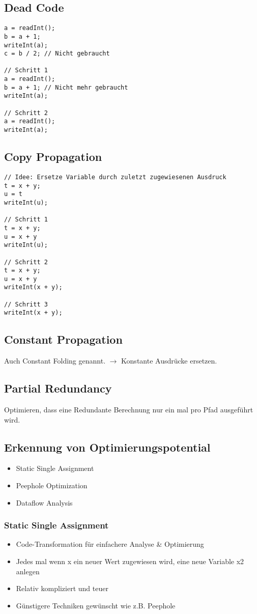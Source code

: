\subsection{Dead Code}
\begin{lstlisting}
a = readInt();
b = a + 1;
writeInt(a);
c = b / 2; // Nicht gebraucht

// Schritt 1
a = readInt();
b = a + 1; // Nicht mehr gebraucht
writeInt(a);

// Schritt 2
a = readInt();
writeInt(a);
\end{lstlisting}

\subsection{Copy Propagation}
\begin{lstlisting}
// Idee: Ersetze Variable durch zuletzt zugewiesenen Ausdruck
t = x + y;
u = t
writeInt(u);

// Schritt 1
t = x + y;
u = x + y
writeInt(u);

// Schritt 2
t = x + y;
u = x + y
writeInt(x + y);

// Schritt 3
writeInt(x + y);
\end{lstlisting}

\subsection{Constant Propagation}
Auch Constant Folding genannt. $\rightarrow$ Konstante Ausdrücke ersetzen.

\subsection{Partial Redundancy}
Optimieren, dass eine Redundante Berechnung nur ein mal pro Pfad ausgeführt wird.

\subsection{Erkennung von Optimierungspotential}
\begin{itemize}[topsep=0pt]
    \itemsep -0.2em
    \item Static Single Assignment
    \item Peephole Optimization
    \item Dataflow Analysis
\end{itemize}

\subsubsection{Static Single Assignment}
\begin{itemize}[topsep=0pt]
    \itemsep -0.2em
    \item Code-Transformation für einfachere Analyse \& Optimierung
    \item Jedes mal wenn x ein neuer Wert zugewiesen wird, eine neue Variable x2 anlegen
    \item Relativ kompliziert und teuer
    \item Günstigere Techniken gewünscht wie z.B. Peephole
\end{itemize}

